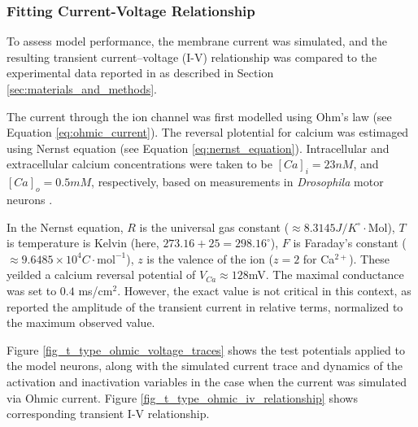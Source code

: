 \documentclass[../main.tex]{subfiles}
\begin{document}

\subsubsection{Fitting Current-Voltage Relationship}

To assess model performance, the membrane current was simulated, and the resulting transient current–voltage (I-V) relationship was compared to the experimental data reported in \textcite{jeongCaa1TFlyTtype2015} as described in Section \ref{sec:materials_and_methods}.

The current through the ion channel was first modelled using Ohm's law (see Equation \ref{eq:ohmic_current}). The reversal plotential for calcium was estimaged using Nernst equation
(see Equation \ref{eq:nernst_equation}). Intracellular and extracellular calcium concentrations were taken to be $[Ca]_i=23 nM$, and $[Ca]_o = 0.5 mM$, respectively, based on measurements in \textit{Drosophila} motor neurons \parencite{macleodFastCalciumSignals2002}.

In the Nernst equation, $R$ is the universal gas constant
($\approx 8.3145 J/K^\circ \cdot \text{Mol}$), $T$ is temperature is Kelvin (here, $273.16+25=298.16^{\circ}$), $F$ is Faraday's constant
($\approx 9.6485 \times 10^{4} C\cdot \text{mol}^{-1}$), $z$ is the valence of the ion ($z=2$ for Ca$^{2+}$). These yeilded a calcium reversal potential of $V_{Ca}\approx 128$mV. The maximal conductance was set to $0.4$ ms/cm$^2$. However, the exact value is not critical in this context, as \textcite{jeongCaa1TFlyTtype2015} reported the amplitude of the transient current in relative terms, normalized to the maximum observed value.

Figure \ref{fig_t_type_ohmic_voltage_traces} shows the test potentials applied to the model neurons, along with the simulated current trace and dynamics of the activation and inactivation variables in the case when the current was simulated via Ohmic current. Figure \ref{fig_t_type_ohmic_iv_relationship} shows corresponding transient I-V relationship.
\end{document}
